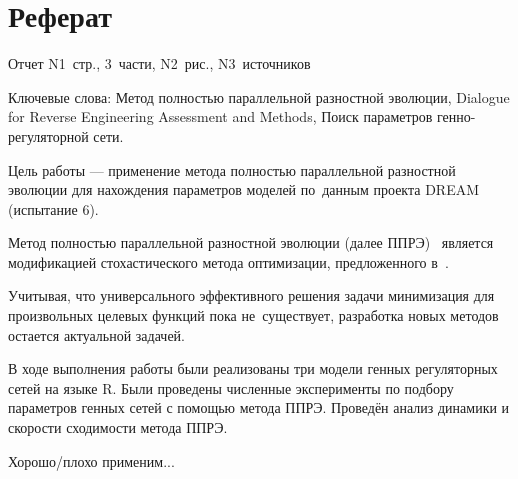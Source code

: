 \chapter*{Реферат}							%

Отчет N1~стр., 3~части, N2~рис., N3~источников

Ключевые слова: Метод полностью параллельной разностной эволюции, Dialogue for 
Reverse Engineering Assessment and Methods, Поиск параметров генно-регуляторной 
сети.

Цель работы — применение метода полностью параллельной разностной эволюции для 
нахождения параметров моделей по~данным проекта DREAM (испытание 6).

Метод полностью параллельной разностной эволюции (далее ППРЭ)~\cite{bib2,bib5} 
является модификацией стохастического метода оптимизации, предложенного 
в~\cite{bib1}. 

Учитывая, что универсального эффективного решения задачи минимизация для 
произвольных целевых функций пока не~существует, разработка новых методов 
остается актуальной задачей. 

В ходе выполнения работы были реализованы три модели генных регуляторных сетей
на языке R. Были проведены численные эксперименты по подбору параметров генных
сетей с помощью метода ППРЭ. Проведён анализ динамики и скорости сходимости 
метода ППРЭ.

Хорошо/плохо применим...

\clearpage

